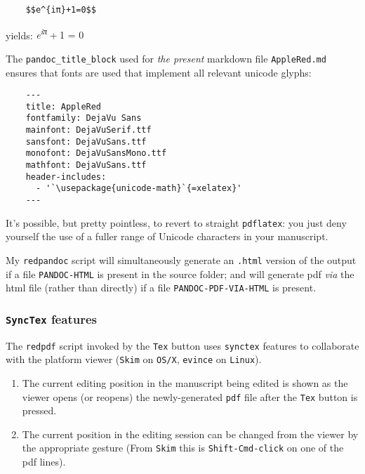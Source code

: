 \documentclass[
]{article}
\begin{document}
\begin{verbatim}
    $$e^{iπ}+1=0$$
\end{verbatim}

yields: {\emph{e}\textsuperscript{\emph{iπ}} + 1 = 0}

The \texttt{pandoc\_title\_block} used for \emph{the present} markdown
file \texttt{AppleRed.md} ensures that fonts are used that implement all
relevant unicode glyphs:

\begin{verbatim}
    ---
    title: AppleRed
    fontfamily: DejaVu Sans
    mainfont: DejaVuSerif.ttf
    sansfont: DejaVuSans.ttf
    monofont: DejaVuSansMono.ttf 
    mathfont: DejaVuSans.ttf
    header-includes:
      - '`\usepackage{unicode-math}`{=xelatex}'
    ---
\end{verbatim}

It's possible, but pretty pointless, to revert to straight
\texttt{pdflatex}: you just deny yourself the use of a fuller range of
Unicode characters in your manuscript.

My \texttt{redpandoc} script will simultaneously generate an
\texttt{.html} version of the output if a file \texttt{PANDOC-HTML} is
present in the source folder; and will generate pdf \emph{via} the html
file (rather than directly) if a file \texttt{PANDOC-PDF-VIA-HTML} is
present.

\hypertarget{synctex-features}{%
\subsubsection{\texorpdfstring{\texttt{SyncTex}
features}{SyncTex features}}\label{synctex-features}}

The \texttt{redpdf} script invoked by the \texttt{Tex} button uses
\texttt{synctex} features to collaborate with the platform viewer
(\texttt{Skim} on \texttt{OS/X}, \texttt{evince} on \texttt{Linux}).

\begin{enumerate}
\def\labelenumi{\arabic{enumi}.}
\item
  The current editing position in the manuscript being edited is shown
  as the viewer opens (or reopens) the newly-generated \texttt{pdf} file
  after the \texttt{Tex} button is pressed.
\item
  The current position in the editing session can be changed from the
  viewer by the appropriate gesture (From \texttt{Skim} this is
  \texttt{Shift-Cmd-click} on one of the pdf lines).
\end{enumerate}
\end{document}
